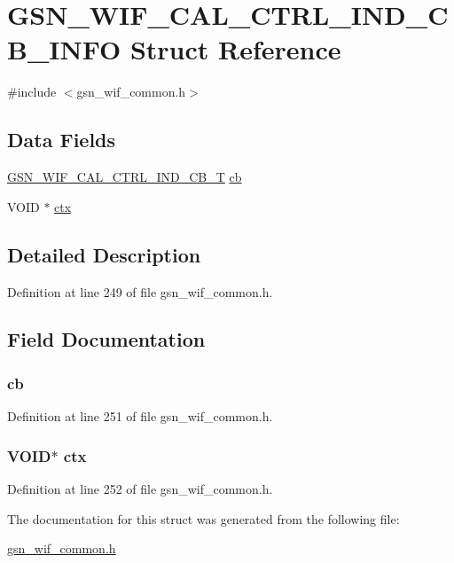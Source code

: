 \hypertarget{a00318}{
\section{GSN\_\-WIF\_\-CAL\_\-CTRL\_\-IND\_\-CB\_\-INFO Struct Reference}
\label{a00318}
}


{\ttfamily \#include $<$gsn\_\-wif\_\-common.h$>$}

\subsection*{Data Fields}
\begin{DoxyCompactItemize}
\item 
\hyperlink{a00635_ga713dea098107eba190695d6e868ff027}{GSN\_\-WIF\_\-CAL\_\-CTRL\_\-IND\_\-CB\_\-T} \hyperlink{a00318_a2240256e49e431c0c5ebc3fa3c8b8cf7}{cb}
\item 
VOID $\ast$ \hyperlink{a00318_add401254b29adaa41706c97d1c8d3e89}{ctx}
\end{DoxyCompactItemize}


\subsection{Detailed Description}


Definition at line 249 of file gsn\_\-wif\_\-common.h.



\subsection{Field Documentation}
\hypertarget{a00318_a2240256e49e431c0c5ebc3fa3c8b8cf7}{
\subsubsection[{cb}]{ {\bf cb}}}
\label{a00318_a2240256e49e431c0c5ebc3fa3c8b8cf7}


Definition at line 251 of file gsn\_\-wif\_\-common.h.

\hypertarget{a00318_add401254b29adaa41706c97d1c8d3e89}{
\subsubsection[{ctx}]{\setlength{\rightskip}{0pt plus 5cm}VOID$\ast$ {\bf ctx}}}
\label{a00318_add401254b29adaa41706c97d1c8d3e89}


Definition at line 252 of file gsn\_\-wif\_\-common.h.



The documentation for this struct was generated from the following file:\begin{DoxyCompactItemize}
\item 
\hyperlink{a00608}{gsn\_\-wif\_\-common.h}\end{DoxyCompactItemize}
